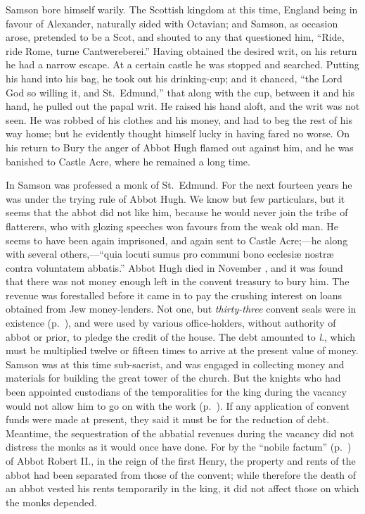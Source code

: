 \documentclass[10pt]{book}
\begin{document}
{Samson bore himself warily. The Scottish kingdom at this time, England being in favour of Alexander, naturally sided with Octavian; and Samson, as occasion arose, pretended to be a Scot, and shouted to any that questioned him, ``Ride, ride Rome, turne Cantwereberei.'' Having obtained the desired writ, on his return he had a narrow escape. At a certain castle he was stopped and searched. Putting his hand into his bag, he took out his drinking-cup; and it chanced, ``the Lord God so willing it, and St.\ Edmund,'' that along with the cup, between it and his hand, he pulled out the papal writ. He raised his hand aloft, and the writ was not seen. He was robbed of his clothes and his money, and had to beg the rest of his way home; but he evidently thought himself lucky in having fared no worse. On his return to Bury the anger of Abbot Hugh flamed out against him, and he was banished to Castle Acre, where he remained a long time.

In  Samson was professed a monk of St.\ Edmund. For the next fourteen years he was under the trying rule of Abbot Hugh. We know but few particulars, but it seems that the abbot did not like him, because he would never join the tribe of flatterers, who with glozing speeches won favours from the weak old man. He seems to have been again imprisoned, and again sent to Castle Acre;---he along with several others,---``quia locuti sumus pro communi bono ecclesi\ae{} nostr\ae{} contra voluntatem abbatis.'' Abbot Hugh died in November , and it was found that there was not money enough left in the convent treasury to bury him. The revenue was forestalled before it came in to pay the crushing interest on loans obtained from Jew money-lenders. Not one, but \emph{thirty-three} convent seals were in existence (p.\ ), and were used by various office-holders, without authority of abbot or prior, to pledge the credit of the house. The debt amounted to \emph{l}., which must be multiplied twelve or fifteen times to arrive at the present value of money. Samson was at this time sub-sacrist, and was engaged in collecting money and materials for building the great tower of the church. But the knights who had been appointed custodians of the temporalities for the king during the vacancy would not allow him to go on with the work (p.\ ). If any application of convent funds were made at present, they said it must be for the reduction of debt. Meantime, the sequestration of the abbatial revenues during the vacancy did not distress the monks as it would once have done. For by the ``nobile factum'' (p.\ ) of Abbot Robert II., in the reign of the first Henry, the property and rents of the abbot had been separated from those of the convent; while therefore the death of an abbot vested his rents temporarily in the king, it did not affect those on which the monks depended.

}
\end{document}
